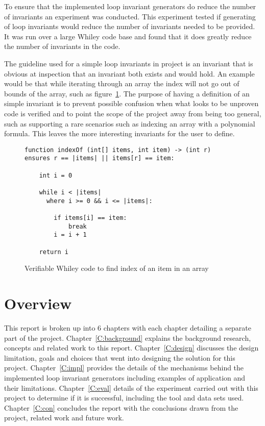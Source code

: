 To ensure that the implemented loop invariant generators do reduce
the number of invariants an experiment was conducted.
This experiment tested if generating of loop invariants 
would reduce the number of invariants needed to be provided.
It was run over a large Whiley code base and found that
it does greatly reduce the number of invariants in the code.

The guideline used for a simple loop invariants in project is an invariant that is
obvious at inspection that an invariant both exists and would hold.
An example would be that while iterating through an array the index
will not go out of bounds of the array, such as figure~\ref{lst:whiley-ex-1}.
The purpose of having a definition of an simple invariant is to prevent
possible confusion when what looks to be unproven code is verified and to point
the scope of the project away from being too general, such as supporting
a rare scenarios such as indexing an array with a polynomial formula.
This leaves the more interesting invariants for the user to define.

\begin{figure}[ht]
\begin{lstlisting}
function indexOf (int[] items, int item) -> (int r)
ensures r == |items| || items[r] == item:

    int i = 0

    while i < |items|
      where i >= 0 && i <= |items|:

        if items[i] == item:
            break
        i = i + 1

    return i
\end{lstlisting}
\caption{Verifiable Whiley code to find index of an item in an array}
\label{lst:whiley-ex-1}
\end{figure}


\section{Overview}

This report is broken up into 6 chapters with each chapter detailing a separate part of the project.
Chapter~\ref{C:background} explains the background research, concepts and related work to this report.
Chapter~\ref{C:design} discusses the design limitation, goals and choices that went into designing the
solution for this project.
Chapter~\ref{C:impl} provides the details of the mechanisms behind the implemented 
loop invariant generators including examples of application and their limitations.
Chapter~\ref{C:eval} details of the experiment carried out with this project to determine if it is
successful, including the tool and data sets used.
Chapter~\ref{C:con} concludes the report with the conclusions drawn from the project,
related work and future work.  